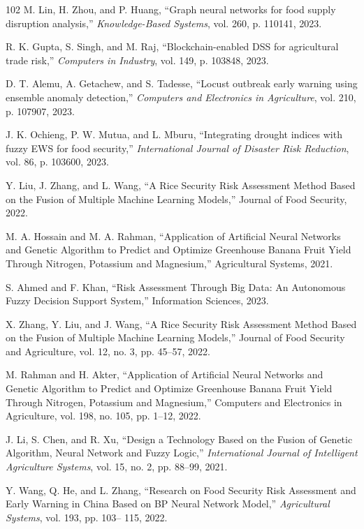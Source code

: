 \documentclass[preprint,12pt]{elsarticle}
\begin{document}
\begin{thebibliography}{102}
		M. Lin, H. Zhou, and P. Huang, ``Graph neural networks for food supply disruption analysis,'' \emph{Knowledge-Based Systems}, vol. 260, p. 110141, 2023.
		
		R. K. Gupta, S. Singh, and M. Raj, ``Blockchain-enabled DSS for agricultural trade risk,'' \emph{Computers in Industry}, vol. 149, p. 103848, 2023.
		
		D. T. Alemu, A. Getachew, and S. Tadesse, ``Locust outbreak early warning using ensemble anomaly detection,'' \emph{Computers and Electronics in Agriculture}, vol. 210, p. 107907, 2023.
		
		J. K. Ochieng, P. W. Mutua, and L. Mburu, ``Integrating drought indices with fuzzy EWS for food security,'' \emph{International Journal of Disaster Risk Reduction}, vol. 86, p. 103600, 2023.
		
		Y. Liu, J. Zhang, and L. Wang, ``A Rice Security Risk Assessment Method Based on the Fusion of Multiple Machine Learning Models,'' Journal of Food Security, 2022.
		
		M. A. Hossain and M. A. Rahman, ``Application of Artificial Neural Networks and Genetic Algorithm to Predict and Optimize Greenhouse Banana Fruit Yield Through Nitrogen, Potassium and Magnesium,'' Agricultural Systems, 2021.
		
		S. Ahmed and F. Khan, ``Risk Assessment Through Big Data: An Autonomous Fuzzy Decision Support System,'' Information Sciences, 2023.
		
		X. Zhang, Y. Liu, and J. Wang, ``A Rice Security Risk Assessment Method Based on the Fusion of Multiple Machine Learning Models,'' Journal of Food Security and Agriculture, vol. 12, no. 3, pp. 45--57, 2022.
		
		M. Rahman and H. Akter, ``Application of Artificial Neural Networks and Genetic Algorithm to Predict and Optimize Greenhouse Banana Fruit Yield Through Nitrogen, Potassium and Magnesium,'' Computers and Electronics in Agriculture, vol. 198, no. 105, pp. 1--12, 2022.
		
		J. Li, S. Chen, and R. Xu, ``Design a Technology Based on the Fusion of Genetic Algorithm, Neural Network and Fuzzy Logic,'' \emph{International Journal of Intelligent Agriculture Systems}, vol. 15, no. 2, pp. 88--99, 2021.
		
		Y. Wang, Q. He, and L. Zhang, ``Research on Food Security Risk Assessment and Early Warning in China Based on BP Neural Network Model,'' \emph{Agricultural Systems}, vol. 193, pp. 103-- 115, 2022.
		

\end{thebibliography}
\end{document}
